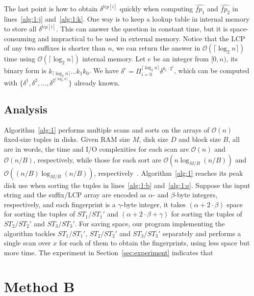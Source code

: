 \documentclass[10pt,journal,compsoc]{IEEEtran}
\begin{document}
The last point is how to obtain $\delta^{lcp[i]}$ quickly when computing $\hat{fp_1}$ and $\hat{fp_2}$ in lines~\ref{alg:1:j} and~\ref{alg:1:k}. One way is to keep a lookup table in internal memory to store all $\delta^{lcp[i]}$. This can answer the question in constant time, but it is space-consuming and impractical to be used in external memory. Notice that the LCP of any two suffixes is shorter than $n$, we can return the answer in $\mathcal{O}(\lceil \log_2{n} \rceil)$ time using $\mathcal{O}(\lceil \log_2{n} \rceil)$ internal memory. Let $e$ be an integer from $[0, n)$, its binary form is $k_{\lceil \log_2{n} \rceil}...k_1k_0$. We have $\delta^e = \Pi_{i = 0}^{\lceil \log_2{n} \rceil}{\delta}^{k_i \cdot 2^i}$, which can be computed with $\{{\delta}^{1}, {\delta}^{2}, \dots, {\delta}^{2^{\lceil \log_2{n} \rceil}} \}$ already known.

\subsection{Analysis} \label{sec:method1:analysis}


Algorithm~\ref{alg:1} performs multiple scans and sorts on the arrays of $\mathcal{O}(n)$ fixed-size tuples in disks. Given RAM size $M$, disk size $D$ and block size $B$, all are in words, the time and I/O complexities for each scan are $\mathcal{O}(n)$ and $\mathcal{O}(n / B)$, respectively, while those for each sort are $\mathcal{O}(n\log_{M/ B}(n / B))$ and $\mathcal{O}((n / B)\log_{M / B}(n / B))$, respectively~\cite{Arge2013}. Algorithm~\ref{alg:1} reaches its peak disk use when sorting the tuples in lines~\ref{alg:1:b} and~\ref{alg:1:e}. Suppose the input string and the suffix/LCP array are encoded as $\alpha$- and $\beta$-byte integers, respectively, and each fingerprint is a $\gamma$-byte integer, it takes $(\alpha +2 \cdot \beta)$ space for sorting the tuples of $ST_1/ST_1'$ and $(\alpha + 2 \cdot \beta + \gamma)$ for sorting the tuples of $ST_2/ST_2'$ and $ST_3/ST_3'$. For saving space, our program implementing the algorithm tackles $ST_1/ST_1'$, $ST_2/ST_2'$ and $ST_3/ST_3'$ separately and performs a single scan over $x$ for each of them to obtain the fingerprints, using less space but more time. The experiment in Section~\ref{sec:experiment} indicates that {\color{red}{the disk use is 40 times the size of $x$.}}

\section{Method B} \label{sec:method2}
\end{document}
